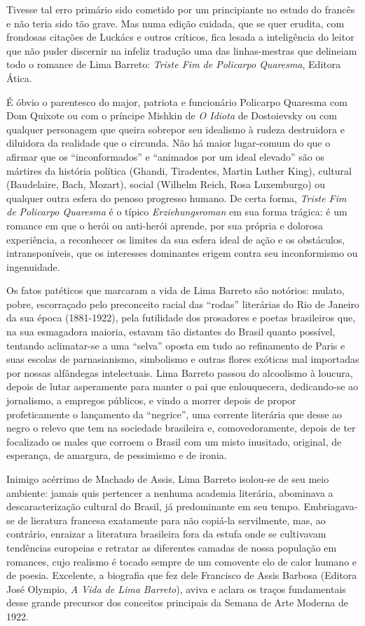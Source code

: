 \documentclass[
  letterpaper,
  DIV=11,
  numbers=noendperiod]{scrreprt}
\begin{document}
Tivesse tal erro primário sido cometido por um principiante no estudo do
francês e não teria sido tão grave. Mas numa edição cuidada, que se quer
erudita, com frondosas citações de Luckács e outros críticos, fica
lesada a inteligência do leitor que não puder discernir na infeliz
tradução uma das linhas-mestras que delineiam todo o romance de Lima
Barreto: \emph{Triste Fim de Policarpo Quaresma}, Editora Ática.

É óbvio o parentesco do major, patriota e funcionário Policarpo Quaresma
com Dom Quixote ou com o príncipe Mishkin de \emph{O Idiota} de
Dostoievsky ou com qualquer personagem que queira sobrepor seu idealismo
à rudeza destruidora e diluidora da realidade que o circunda. Não há
maior lugar-comum do que o afirmar que os ``inconformados'' e ``animados
por um ideal elevado'' são os mártires da história política (Ghandi,
Tiradentes, Martin Luther King), cultural (Baudelaire, Bach, Mozart),
social (Wilhelm Reich, Rosa Luxemburgo) ou qualquer outra esfera do
penoso progresso humano. De certa forma, \emph{Triste Fim de Policarpo
Quaresma} é o típico \emph{Erziehungsroman} em sua forma trágica: é um
romance em que o herói ou anti-herói aprende, por sua própria e dolorosa
experiência, a reconhecer os limites da sua esfera ideal de ação e os
obstáculos, intransponíveis, que os interesses dominantes erigem contra
seu inconformismo ou ingenuidade.

Os fatos patéticos que marcaram a vida de Lima Barreto são notórios:
mulato, pobre, escorraçado pelo preconceito racial das ``rodas''
literárias do Rio de Janeiro da sua época (1881-1922), pela futilidade
dos prosadores e poetas brasileiros que, na sua esmagadora maioria,
estavam tão distantes do Brasil quanto possível, tentando aclimatar-se a
uma ``selva'' oposta em tudo ao refinamento de Paris e suas escolas de
parnasianismo, simbolismo e outras flores exóticas mal importadas por
nossas alfândegas intelectuais. Lima Barreto passou do alcoolismo à
loucura, depois de lutar asperamente para manter o pai que enlouquecera,
dedicando-se ao jornalismo, a empregos públicos, e vindo a morrer depois
de propor profeticamente o lançamento da ``negrice'', uma corrente
literária que desse ao negro o relevo que tem na sociedade brasileira e,
comovedoramente, depois de ter focalizado os males que corroem o Brasil
com um misto inusitado, original, de esperança, de amargura, de
pessimismo e de ironia.

Inimigo acérrimo de Machado de Assis, Lima Barreto isolou-se de seu meio
ambiente: jamais quis pertencer a nenhuma academia literária, abominava
a descaracterização cultural do Brasil, já predominante em seu tempo.
Embriagava-se de lieratura francesa exatamente para não copiá-la
servilmente, mas, ao contrário, enraizar a literatura brasileira fora da
estufa onde se cultivavam tendências europeias e retratar as diferentes
camadas de nossa população em romances, cujo realismo é tocado sempre de
um comovente elo de calor humano e de poesia. Excelente, a biografia que
fez dele Francisco de Assis Barbosa (Editora José Olympio, \emph{A Vida
de Lima Barreto}), aviva e aclara os traços fundamentais desse grande
precursor dos conceitos principais da Semana de Arte Moderna de 1922.
\end{document}
